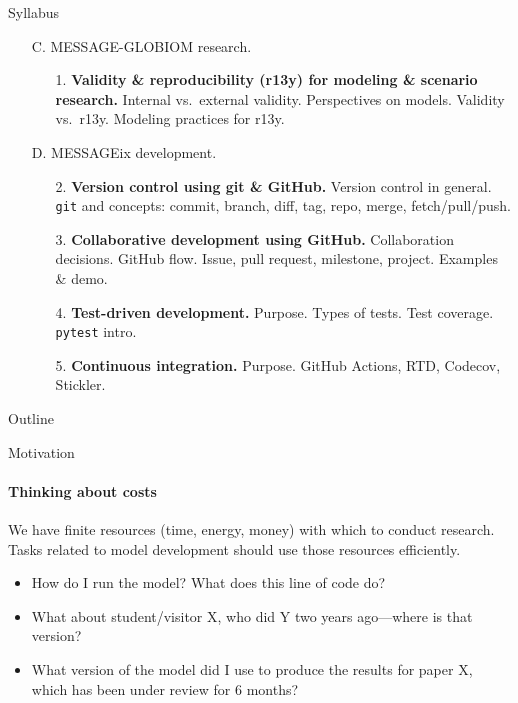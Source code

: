 \documentclass[12pt,aspectratio=169]{beamer}
\begin{document}
\begin{frame}{Syllabus}

  \begin{enumerate}
    \item [C.] MESSAGE-GLOBIOM research.
          \begin{enumerate}
            \item [1.] \textbf{Validity \& reproducibility (r13y) for modeling \& scenario research.} Internal vs.\ external validity. Perspectives on models. Validity vs.\ r13y. Modeling practices for r13y.
          \end{enumerate}

    \item [D.] MESSAGEix development.
          \begin{enumerate}
            \item [2.] \textbf{Version control using {\ttfamily git} \& GitHub.} Version control in general. \texttt{git} and concepts: commit, branch, diff, tag, repo, merge, fetch/pull/push.
            \item [3.] \textbf{Collaborative development using GitHub.} Collaboration decisions. GitHub flow. Issue, pull request, milestone, project. Examples \& demo.
            \item [4.] \textbf{Test-driven development.} Purpose. Types of tests. Test coverage. \texttt{pytest} intro.
            \item [5.] \textbf{Continuous integration.} Purpose. GitHub Actions, RTD, Codecov, Stickler.
          \end{enumerate}

  \end{enumerate}


\end{frame}

\begin{frame}{Outline}
  \tableofcontents[hideallsubsections]
\end{frame}

\begin{frame}{Motivation}
  \framesubtitle{Thinking about costs}

  We have finite resources (time, energy, money) with which to conduct research.
  Tasks related to model development should use those resources efficiently.

  \bigskip

  \begin{itemize}
    \item How do I run the model? What does this line of code do?
    \item What about student/visitor X, who did Y two years ago—where is that version?
    \item What version of the model did I use to produce the results for paper X, which has been under review for 6 months?
  \end{itemize}

\end{frame}
\end{document}
